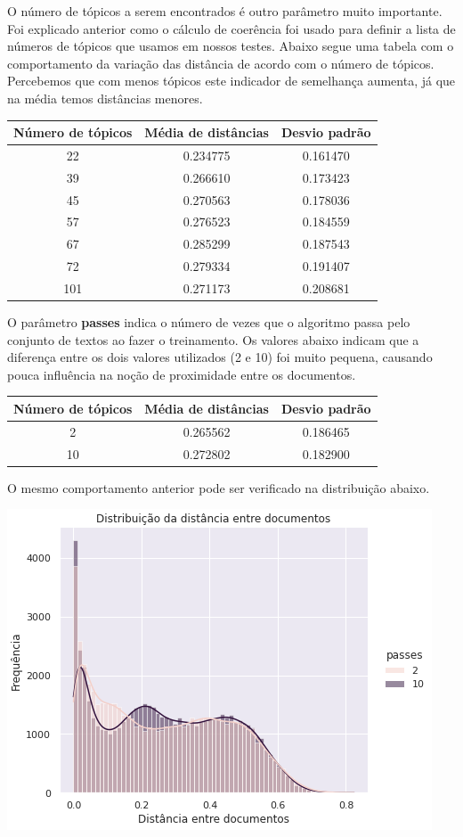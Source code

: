 O número de tópicos a serem encontrados é outro parâmetro muito importante. Foi explicado anterior como o cálculo de coerência foi usado para definir 
a lista de números de tópicos que usamos em nossos testes. Abaixo segue uma tabela com o comportamento da variação das distância de acordo
com o número de tópicos. Percebemos que com menos tópicos este indicador de semelhança aumenta, já que na média temos distâncias menores.

\begin{center}
    \begin{tabular}{|c|c|c|}
        \hline
        Número de tópicos & Média de distâncias & Desvio padrão \\ 
        \hline
        22 & 0.234775 & 0.161470 \\ 
        \hline
        39 & 0.266610 & 0.173423 \\ 
        \hline
        45 & 0.270563 & 0.178036 \\ 
        \hline
        57 & 0.276523 & 0.184559 \\ 
        \hline
        67 & 0.285299 & 0.187543 \\ 
        \hline
        72 & 0.279334 & 0.191407 \\ 
        \hline
        101 & 0.271173 & 0.208681 \\      
        \hline
    \end{tabular}
\end{center}

O parâmetro \textbf{passes} indica o número de vezes que o algoritmo passa pelo conjunto de textos ao fazer o treinamento. Os valores abaixo indicam
que a diferença entre os dois valores utilizados (2 e 10) foi muito pequena, causando pouca influência na noção de proximidade entre os documentos.

\begin{center}
    \begin{tabular}{|c|c|c|}
        \hline
        Número de tópicos & Média de distâncias & Desvio padrão \\ 
        \hline
        2 & 0.265562 & 0.186465 \\ 
        \hline
        10 & 0.272802 & 0.182900 \\         
        \hline
    \end{tabular}
\end{center}

O mesmo comportamento anterior pode ser verificado na distribuição abaixo.

\includegraphics[scale=0.7]{resultados/resources/distribuicao_distancias_passes.png}
